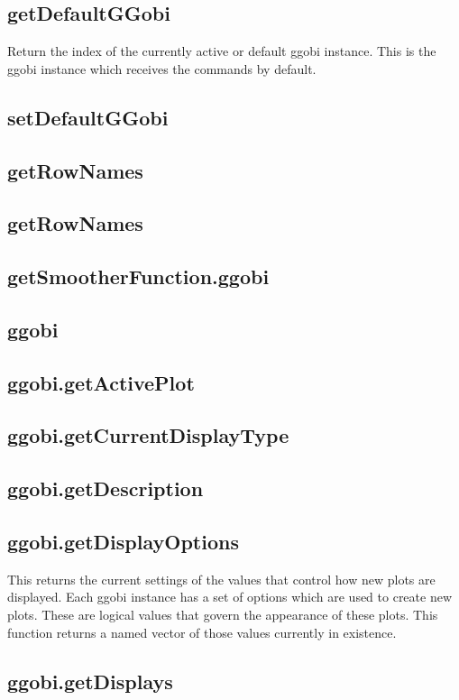 \documentclass{article}
\begin{document}
\subsection{getDefaultGGobi}
Return the index of the currently active
or default ggobi instance.
This is the ggobi instance which 
receives the commands by default.


\subsection{setDefaultGGobi}

\subsection{getRowNames}
\subsection{getRowNames}
\subsection{getSmootherFunction.ggobi}
\subsection{ggobi}
\subsection{ggobi.getActivePlot}
\subsection{ggobi.getCurrentDisplayType}
\subsection{ggobi.getDescription}
\subsection{ggobi.getDisplayOptions}
This returns the current settings of the values that control how new
plots are displayed.  Each ggobi instance has a set of options which
are used to create new plots.  These are logical values that govern
the appearance of these plots.  This function returns a named vector
of those values currently in existence.



\subsection{ggobi.getDisplays}
\end{document}
